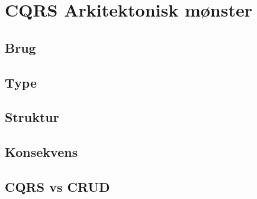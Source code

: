 \chapter{CQRS Arkitektonisk mønster}

\section{Brug}

\section{Type}

\section{Struktur}

\section{Konsekvens}

\section{CQRS vs CRUD}

